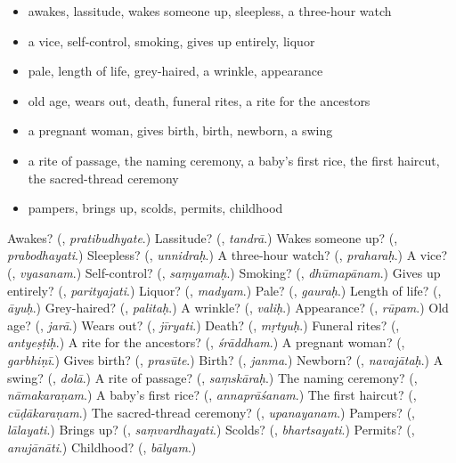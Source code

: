 \begin{itemize}
\raggedright
  \item awakes, lassitude, wakes someone up, sleepless, a three-hour watch
  \item a vice, self-control, smoking, gives up entirely, liquor
  \item pale, length of life, grey-haired, a wrinkle, appearance
  \item old age, wears out, death, funeral rites, a rite for the ancestors
  \item a pregnant woman, gives birth, birth, newborn, a swing
  \item a rite of passage, the naming ceremony, a baby's first rice, the first haircut, the sacred-thread ceremony
  \item pampers, brings up, scolds, permits, childhood
\end{itemize}

\begin{tcolorbox}[breakable,colback=teal!4,colframe=teal!35!black,title={Before you move on}]
Awakes? (\textbf{}, \emph{pratibudhyate}.) Lassitude? (\textbf{}, \emph{tandrā}.) Wakes someone up? (\textbf{}, \emph{prabodhayati}.) Sleepless? (\textbf{}, \emph{unnidraḥ}.) A three-hour watch? (\textbf{}, \emph{praharaḥ}.) A vice? (\textbf{}, \emph{vyasanam}.) Self-control? (\textbf{}, \emph{saṃyamaḥ}.) Smoking? (\textbf{}, \emph{dhūmapānam}.) Gives up entirely? (\textbf{}, \emph{parityajati}.) Liquor? (\textbf{}, \emph{madyam}.) Pale? (\textbf{}, \emph{gauraḥ}.) Length of life? (\textbf{}, \emph{āyuḥ}.) Grey-haired? (\textbf{}, \emph{palitaḥ}.) A wrinkle? (\textbf{}, \emph{valiḥ}.) Appearance? (\textbf{}, \emph{rūpam}.) Old age? (\textbf{}, \emph{jarā}.) Wears out? (\textbf{}, \emph{jīryati}.) Death? (\textbf{}, \emph{mṛtyuḥ}.) Funeral rites? (\textbf{}, \emph{antyeṣṭiḥ}.) A rite for the ancestors? (\textbf{}, \emph{śrāddham}.) A pregnant woman? (\textbf{}, \emph{garbhiṇī}.) Gives birth? (\textbf{}, \emph{prasūte}.) Birth? (\textbf{}, \emph{janma}.) Newborn? (\textbf{}, \emph{navajātaḥ}.) A swing? (\textbf{}, \emph{dolā}.) A rite of passage? (\textbf{}, \emph{saṃskāraḥ}.) The naming ceremony? (\textbf{}, \emph{nāmakaraṇam}.) A baby's first rice? (\textbf{}, \emph{annaprāśanam}.) The first haircut? (\textbf{}, \emph{cūḍākaraṇam}.) The sacred-thread ceremony? (\textbf{}, \emph{upanayanam}.) Pampers? (\textbf{}, \emph{lālayati}.) Brings up? (\textbf{}, \emph{saṃvardhayati}.) Scolds? (\textbf{}, \emph{bhartsayati}.) Permits? (\textbf{}, \emph{anujānāti}.) Childhood? (\textbf{}, \emph{bālyam}.)
\end{tcolorbox}
